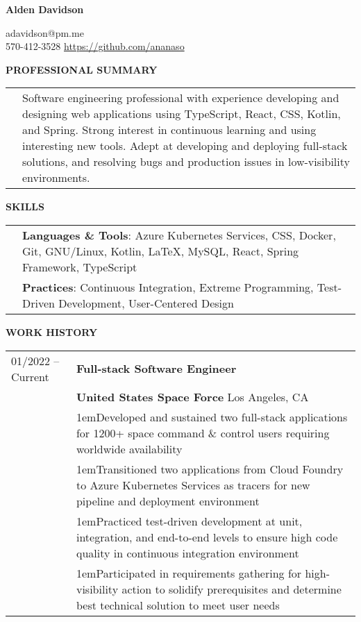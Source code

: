 \documentclass[11pt]{article}
\newlength{\dateColumnWidth}
\newcommand{\customBulletLabel}{\raisebox{0.4ex}{\tiny$\bullet$}}
\newcommand{\detail}{\par\noindent\makebox[1em][l]{\customBulletLabel}\hangindent1em}
\begin{document}
\begin{center}
\begin{minipage}{0.65\textwidth}
	{\Huge\textbf{Alden Davidson}}
\end{minipage}%
\begin{minipage}{0.35\textwidth}
	\raggedleft
	adavidson@pm.me\\
    570-412-3528
    \url{https://github.com/ananaso}
\end{minipage}
\end{center}
{\Large \textbf{PROFESSIONAL SUMMARY}}
\bigbreak
\begin{tabularx}{\textwidth}{@{}p{\dateColumnWidth}X@{}}
    & Software engineering professional with experience developing and designing web applications using TypeScript, React, CSS, Kotlin, and Spring.
    Strong interest in continuous learning and using interesting new tools.
    Adept at developing and deploying full-stack solutions, and resolving bugs and production issues in low-visibility environments.
\end{tabularx}
\bigbreak
{\Large \textbf{SKILLS}}
\bigbreak
\begin{tabularx}{\textwidth}{@{}p{\dateColumnWidth}X@{}}
    & \textbf{Languages \& Tools}: Azure Kubernetes Services, CSS, Docker, Git, GNU/Linux, Kotlin, \LaTeX, MySQL, React, Spring Framework, TypeScript \\
    & \textbf{Practices}: Continuous Integration, Extreme Programming, Test-Driven Development, User-Centered Design \\
\end{tabularx}
\bigbreak
{\Large \textbf{WORK HISTORY}}
\bigbreak
\begin{tabularx}{\textwidth}{@{}p{\dateColumnWidth}X@{}}
    01/2022 -- Current & \textbf{Full-stack Software Engineer} \\
    & \textbf{United States Space Force} \textbar{} Los Angeles, CA \\
    & \detail Developed and sustained two full-stack applications for 1200+ space command \& control users requiring worldwide availability \\
    & \detail Transitioned two applications from Cloud Foundry to Azure Kubernetes Services as tracers for new pipeline and deployment environment \\
    & \detail Practiced test-driven development at unit, integration, and end-to-end levels to ensure high code quality in continuous integration environment \\
    & \detail Participated in requirements gathering for high-visibility action to solidify prerequisites and determine best technical solution to meet user needs
\end{tabularx}
\end{document}
